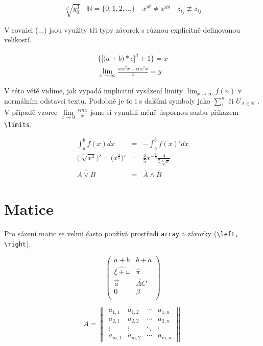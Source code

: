 \documentclass[11pt]{article}
\theoremstyle{definition}
\theoremstyle{plain}
\begin{document}
\begin{multicols*}{2}
	$$
		\sqrt[x^2]{y_0^3} \quad \mathbb{N} = \{0, 1, 2, \dots\} \quad x^{y^y} \ne x^{yy} \quad 
		z_{i_j} \not\equiv z_{ij}
	$$

	V rovnici (...) jsou využity tři typy závorek s různou explicitně definovanou velikostí.

	\begin{eqnarray}
		\bigg\{\Big[\big(a + b\big) * c\Big]^d + 1\bigg\} = x\\
		\lim_{x\rightarrow\infty} \frac{sin^2x + cos^2x}{4} = y \nonumber
	\end{eqnarray}
	

	V této větě vidíme, jak vypadá implicitní vysázení limity $\lim_{x\rightarrow\infty} f(n)$ v normálním odstavci textu. Podobně je to i s dalšími symboly jako $\sum_{1}^{n}$ či $U_{A\in \mathcal{B}}$ . V případě vzorce $\lim\limits_{x\rightarrow 0} \frac{sinx}{x}$ jsme si vynutili méně úspornou sazbu příkazem \verb|\limits|.
	
	\begin{eqnarray}
		\int_{a}^{b} f(x) dx &=& -\int_{a}^{b} f(x)' dx\\\nonumber
		\Big(\sqrt[5]{x^4}\Big)' = \Big(x^{\frac{4}{5}}\Big)' &=& \frac{4}{5}x^{-\frac{1}{5}}  \frac{4}{5\sqrt[5]{x}}\\\nonumber
		\overline{\overline{A \vee B}} &=& \overline{\overline{A} \wedge \overline{B}\nonumber}
	\end{eqnarray}


	\section{Matice}

Pro sázení matic se velmi často používá prostředí \texttt{array} a závorky (\verb|\left, \right|). 
	
	\begin{equation}
		\begin{pmatrix}
		a + b & b + a\\
		\widehat{\xi + \omega} & \hat{\pi} \\
		\vec{a} & \overleftrightarrow{AC} \\
		0 & \beta\\
		\end{pmatrix}\nonumber
	\end{equation}
	
	\begin{equation}
		A = 
 \begin{Vmatrix}
  a_{1,1} & a_{1,2} & \cdots & a_{1,n} \\
  a_{2,1} & a_{2,2} & \cdots & a_{2,n} \\
  \vdots  & \vdots  & \ddots & \vdots  \\
  a_{m,1} & a_{m,2} & \cdots & a_{m,n} 
 \end{Vmatrix}\nonumber
	\end{equation}
	

\end{multicols*}
\end{document}
